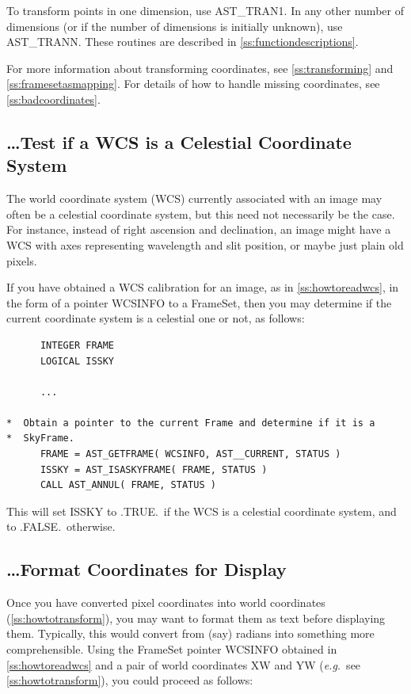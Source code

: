 \documentclass[twoside,11pt]{article}
\newcommand{\htmlref}[2]{#1}
\newcommand{\appref}[1]{Appendix~\ref{#1}}
\newcommand{\secref}[1]{\S\ref{#1}}
\renewcommand{\appref}[1]{\ref{#1}}
\renewcommand{\secref}[1]{\ref{#1}}
\begin{document}
To transform points in one dimension, use \htmlref{AST\_TRAN1}{AST_TRAN1}. In any other
number of dimensions (or if the number of dimensions is initially
unknown), use \htmlref{AST\_TRANN}{AST_TRANN}. These routines are described in
\appref{ss:functiondescriptions}.

For more information about transforming coordinates, see
\secref{ss:transforming} and \secref{ss:framesetasmapping}. For
details of how to handle missing coordinates, see
\secref{ss:badcoordinates}.

\subsection{\label{ss:howtotestforcelestial}\ldots Test if a WCS is a Celestial Coordinate System}

The world coordinate system (WCS) currently associated with an image
may often be a celestial coordinate system, but this need not
necessarily be the case. For instance, instead of right ascension and
declination, an image might have a WCS with axes representing
wavelength and slit position, or maybe just plain old pixels.

If you have obtained a WCS calibration for an image, as in
\secref{ss:howtoreadwcs}, in the form of a pointer WCSINFO to a
\htmlref{FrameSet}{FrameSet}, then you may determine if the current coordinate system is a
celestial one or not, as follows:

\small
\begin{verbatim}
      INTEGER FRAME
      LOGICAL ISSKY

      ...

*  Obtain a pointer to the current Frame and determine if it is a
*  SkyFrame.
      FRAME = AST_GETFRAME( WCSINFO, AST__CURRENT, STATUS )
      ISSKY = AST_ISASKYFRAME( FRAME, STATUS )
      CALL AST_ANNUL( FRAME, STATUS )
\end{verbatim}
\normalsize

This will set ISSKY to .TRUE.\ if the WCS is a celestial coordinate
system, and to .FALSE.\ otherwise.

\subsection{\label{ss:howtoformatcoordinates}\ldots Format Coordinates for Display}

Once you have converted pixel coordinates into world coordinates
(\secref{ss:howtotransform}), you may want to format them as text
before displaying them. Typically, this would convert from (say)
radians into something more comprehensible. Using the \htmlref{FrameSet}{FrameSet} pointer
WCSINFO obtained in \secref{ss:howtoreadwcs} and a pair of world
coordinates XW and YW ({\em{e.g.}}\ see \secref{ss:howtotransform}),
you could proceed as follows:
\end{document}
